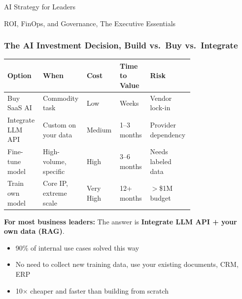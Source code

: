\begin{frame}[fragile]\frametitle{}
\begin{center}
{\Large AI Strategy for Leaders}

{\small ROI, FinOps, and Governance, The Executive Essentials}
\end{center}
\end{frame}

\begin{frame}[fragile]\frametitle{The AI Investment Decision, Build vs.\ Buy vs.\ Integrate}

\begin{center}
\begin{tabular}{|p{0.15\linewidth}|p{0.15\linewidth}|p{0.15\linewidth}|p{0.15\linewidth}|p{0.15\linewidth}|}

\hline
\textbf{Option} & \textbf{When} & \textbf{Cost} & \textbf{Time to Value} & \textbf{Risk} \\
\hline
Buy SaaS AI & Commodity task & Low & Weeks & Vendor lock-in \\
Integrate LLM API & Custom on your data & Medium & 1--3 months & Provider dependency \\
Fine-tune model & High-volume, specific & High & 3--6 months & Needs labeled data \\
Train own model & Core IP, extreme scale & Very High & 12+ months & $>$\$1M budget \\
\hline
\end{tabular}
\end{center}

\vspace{0.3em}
\textbf{For most business leaders:} The answer is \textbf{Integrate LLM API + your own data (RAG)}.
\begin{itemize}
  \item 90\% of internal use cases solved this way
  \item No need to collect new training data, use your existing documents, CRM, ERP
  \item 10$\times$ cheaper and faster than building from scratch
\end{itemize}

\end{frame}

